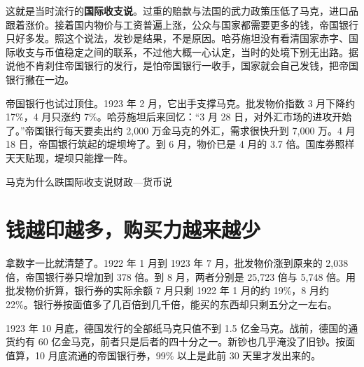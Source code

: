 这就是当时流行的\textbf{国际收支说}。过重的赔款与法国的武力政策压低了马克，进口品跟着涨价。接着国内物价与工资普遍上涨，公众与国家都需要更多的钱，帝国银行只好多发\cite{bresciani1937}。照这个说法，发钞是结果，不是原因。哈芬施坦没有看清国家赤字、国际收支与币值稳定之间的联系，不过他大概一心认定，当时的处境下别无出路。据说他不肯刹住帝国银行的发行，是怕帝国银行一收手，国家就会自己发钱，把帝国银行撇在一边\cite{havenstein1969}。

帝国银行也试过顶住。1923 年 2 月，它出手支撑马克\cite{bresciani1937}。批发物价指数 3 月下降约 17\%，4 月只涨约 7\%\cite{sargent1982}。哈芬施坦后来回忆：“3 月 28 日，对外汇市场的进攻开始了。”帝国银行每天要卖出约 2,000 万金马克的外汇，需求很快升到 7,000 万。4 月 18 日，帝国银行筑起的堤坝垮了\cite{bresciani1937}。到 6 月，物价已是 4 月的 3.7 倍\cite{sargent1982}。国库券照样天天贴现，堤坝只能撑一阵。

\begin{compare}{马克为什么跌}{国际收支说}{财政—货币说}
\end{compare}

\section{钱越印越多，购买力越来越少}\label{sec:weimar-test}

拿数字一比就清楚了。1922 年 1 月到 1923 年 7 月，批发物价涨到原来的 2,038 倍，帝国银行券只增加到 378 倍。到 8 月，两者分别是 25,723 倍与 5,748 倍\cite{sargent1982}。用批发物价折算，银行券的实际余额 7 月只剩 1922 年 1 月的约 19\%，8 月约 22\%。银行券按面值多了几百倍到几千倍，能买的东西却只剩五分之一左右。

1923 年 10 月底，德国发行的全部纸马克只值不到 1.5 亿金马克\cite{bresciani1937}。战前，德国的通货约有 60 亿金马克\cite{keynes1923}，前者只是后者的四十分之一。新钞也几乎淹没了旧钞。按面值算，10 月底流通的帝国银行券，99\% 以上是此前 30 天里才发出来的\cite{sargent1982}。

